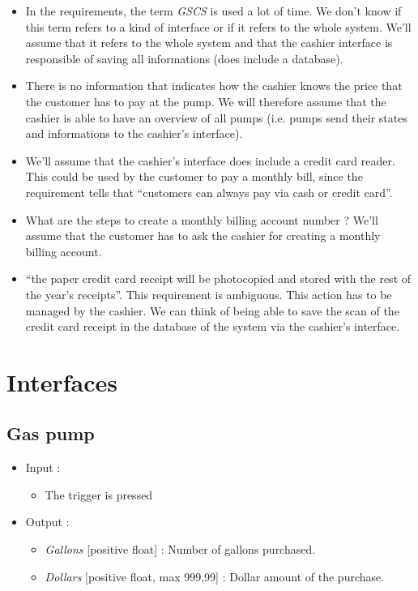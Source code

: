 \documentclass[11pt, a4paper]{article}
\newcommand{\data}[1]{\textit{#1}}
\begin{document}
\begin{itemize}

\item In the requirements, the term \textit{GSCS} is used a lot of time. We don't know if this term refers to a kind of interface or if it refers to the whole system. We'll assume that it refers to the whole system and that the cashier interface is responsible of saving all informations (does include a database).

\item There is no information that indicates how the cashier knows the price that the customer has to pay at the pump. We will therefore assume that the cashier is able to have an overview of all pumps (i.e. pumps send their states and informations to the cashier's interface).

\item We'll assume that the cashier's interface does include a credit card reader. This could be used by the customer to pay a monthly bill, since the requirement tells that \enquote{customers can always pay via cash or credit card}.

\item What are the steps to create a monthly billing account number ? We'll assume that the customer has to ask the cashier for creating a monthly billing account.

\item ``the paper credit card receipt will be photocopied and stored with the rest of the year’s receipts''. This requirement is ambiguous. This action has to be managed by the cashier. We can think of being able to save the scan of the credit card receipt in the database of the system via the cashier's interface.

\end{itemize}



\newpage
\section{Interfaces}

\subsection{Gas pump}

\begin{itemize}
\item Input :
		\begin{itemize}
		\item The trigger is pressed
		\end{itemize}

\item Output :
		\begin{itemize}
		\item \data{Gallons} [positive float] : Number of gallons purchased. 
    \item \data{Dollars} [positive float, max 999,99] : Dollar amount of the purchase.
		\end{itemize}
\end{itemize}
\end{document}
